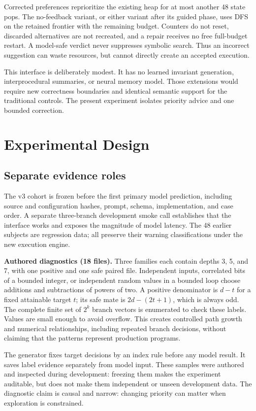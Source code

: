 \documentclass[sigconf]{acmart}
\begin{document}
Corrected preferences reprioritize the existing heap for at most another
48 state pops. The no-feedback variant, or either variant after its guided
phase, uses DFS on the retained frontier with the remaining budget.
Counters do not reset, discarded alternatives are not recreated, and a
repair receives no free full-budget restart. A model-safe verdict never
suppresses symbolic search. Thus an incorrect suggestion can waste
resources, but cannot directly create an accepted execution.

This interface is deliberately modest. It has no learned invariant
generation, interprocedural summaries, or neural memory model. Those
extensions would require new correctness boundaries and identical semantic
support for the traditional controls. The present experiment isolates
priority advice and one bounded correction.

\section{Experimental Design}
\subsection{Separate evidence roles}
The v3 cohort is frozen before the first primary model prediction, including
source and configuration hashes, prompt, schema, implementation, and case
order. A separate three-branch development smoke call establishes that the
interface works and exposes the magnitude of model latency. The 48 earlier
subjects are regression data; all preserve their warning classifications
under the new execution engine.

\textbf{Authored diagnostics (18 files).} Three families each contain
depths 3, 5, and 7, with one positive and one safe paired file.
Independent inputs, correlated bits of a bounded integer, or independent
random values in a bounded loop choose additions and subtractions of
powers of two. A positive denominator is $d-t$ for a fixed attainable
target $t$; its safe mate is $2d-(2t+1)$, which is always odd. The complete
finite set of $2^k$ branch vectors is enumerated to check these labels.
Values are small enough to avoid overflow. This creates controlled path
growth and numerical relationships, including repeated branch decisions,
without claiming that the patterns represent production programs.

The generator fixes target decisions by an index rule before any model
result. It saves label evidence separately from model input. These samples
were authored and inspected during development: freezing them makes the
experiment auditable, but does not make them independent or unseen
development data. The diagnostic claim is causal and narrow: changing
priority can matter when exploration is constrained.
\end{document}
